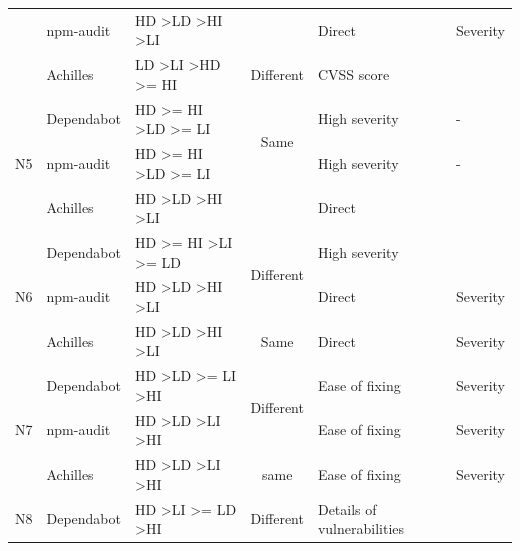 \documentclass[conference]{IEEEtran}
\begin{document}
\begin{table}[tb]
\begin{tabular}{|l|l|l|c|l|l|}
			& npm-audit  & HD \textgreater LD \textgreater HI \textgreater LI          &                                 & Direct                     & Severity                  \\ \cline{2-6} 
			& Achilles   & LD \textgreater LI \textgreater HD \textgreater{}= HI       & Different                       & CVSS score                 &                           \\ \hline
			\multirow{3}{*}{N5}  & Dependabot & HD \textgreater{}= HI \textgreater LD \textgreater{}= LI    & \multirow{2}{*}{Same}           & High severity              & -                         \\ \cline{2-3} \cline{5-6} 
			& npm-audit  & HD \textgreater{}= HI \textgreater LD \textgreater{}= LI    &                                 & High severity              & -                         \\ \cline{2-6} 
			& Achilles   & HD \textgreater LD \textgreater HI \textgreater LI          & \multicolumn{1}{l|}{}           & Direct                     &                           \\ \hline
			\multirow{3}{*}{N6}  & Dependabot & HD \textgreater{}= HI \textgreater LI \textgreater{}= LD    & \multirow{2}{*}{Different}      & High severity              &                           \\ \cline{2-3} \cline{5-6} 
			& npm-audit  & HD \textgreater LD \textgreater HI \textgreater LI          &                                 & Direct                     & Severity                  \\ \cline{2-6} 
			& Achilles   & HD \textgreater LD \textgreater HI \textgreater LI          & Same                            & Direct                     & Severity                  \\ \hline
			\multirow{3}{*}{N7}  & Dependabot & HD \textgreater LD \textgreater{}= LI \textgreater HI       & \multirow{2}{*}{Different}      & Ease of fixing             & Severity                  \\ \cline{2-3} \cline{5-6} 
			& npm-audit  & HD \textgreater LD \textgreater LI \textgreater HI          &                                 & Ease of fixing             & Severity                  \\ \cline{2-6} 
			& Achilles   & HD \textgreater LD \textgreater LI \textgreater HI          & same                            & Ease of fixing             & Severity                  \\ \hline
			\multirow{3}{*}{N8}  & Dependabot & HD \textgreater LI \textgreater{}= LD \textgreater HI       & \multirow{2}{*}{Different}      & Details of vulnerabilities &                           \\ \cline{2-3} \cline{5-6} 

\end{tabular}
\end{table}
\end{document}

